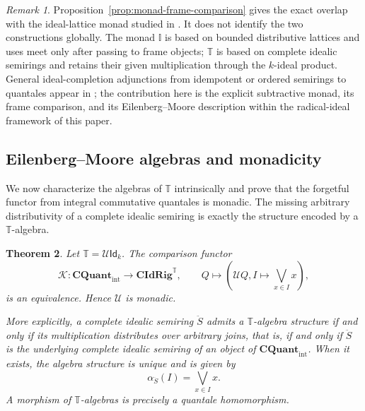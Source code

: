 \documentclass[12pt,leqno]{amsart}
\newcommand{\QuantTop}{\mathbf{CQuant}_{\mathrm{int}}}
\newcommand{\CIdRig}{\mathbf{CIdRig}}
\newcommand{\Idk}{\mathsf{Id}_{k}}
\newtheorem{theorem}{Theorem}[section]
\theoremstyle{definition}
\numberwithin{equation}{section}
\theoremstyle{remark}
\newtheorem{remark}[theorem]{Remark}
\begin{document}
\begin{remark}\label{rem:monad-comparison-scope}
Proposition~\ref{prop:monad-frame-comparison} gives the exact overlap with the ideal-lattice monad studied in \cite{Johnstone,Razafindrakoto25}. It does not identify the two constructions globally. The monad \(\mathbb I\) is based on bounded distributive lattices and uses meet only after passing to frame objects; \(\mathbb T\) is based on complete idealic semirings and retains their given multiplication through the $k$-ideal product. General ideal-completion adjunctions from idempotent or ordered semirings to quantales appear in \cite{NishizawaFurusawa14,Fujii23}; the contribution here is the explicit subtractive monad, its frame comparison, and its Eilenberg--Moore description within the radical-ideal framework of this paper.
\end{remark}

\subsection{Eilenberg--Moore algebras and monadicity}\label{subsec:EM-algebras}

We now characterize the algebras of \(\mathbb T\) intrinsically and prove that the forgetful functor from integral commutative quantales is monadic. The missing arbitrary distributivity of a complete idealic semiring is exactly the structure encoded by a \(\mathbb T\)-algebra.

\begin{theorem}\label{thm:EM-quantales}
Let \(\mathbb T=\mathcal U\Idk\). The comparison functor
\[
\mathcal K\colon\QuantTop\longrightarrow\CIdRig^{\mathbb T},
\qquad
Q\longmapsto
\left(\mathcal UQ,
 I\longmapsto\bigvee_{x\in I}x\right),
\]
is an equivalence. Hence \(\mathcal U\) is monadic.

More explicitly, a complete idealic semiring \(\ddot S\) admits a \(\mathbb T\)-algebra structure if and only if its multiplication distributes over arbitrary joins, that is, if and only if \(\ddot S\) is the underlying complete idealic semiring of an object of \(\QuantTop\). When it exists, the algebra structure is unique and is given by
\[
\alpha_{\ddot S}(I)=\bigvee_{x\in I}x.
\]
A morphism of \(\mathbb T\)-algebras is precisely a quantale homomorphism.
\end{theorem}
\end{document}
